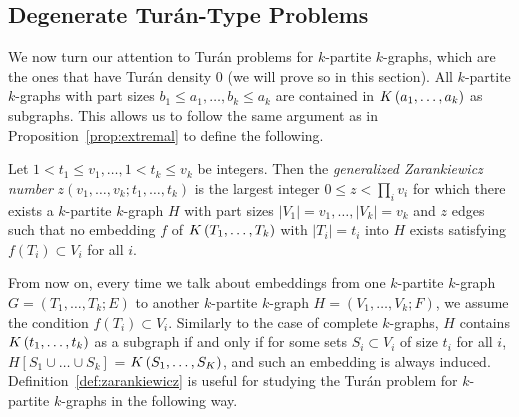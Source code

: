 \subsection{Degenerate Turán-Type Problems}\label{subsec:degenerate}

We now turn our attention to Turán problems for $k$-partite $k$-graphs,
which are the ones that have Turán density $0$ (we will prove so in this section).
All $k$-partite $k$-graphs with part sizes $b_1 \leq a_1, \dots, b_k \leq a_k$
are contained in $K\left(a_1, \dots, a_k\right)$ as subgraphs.
This allows us to follow the same argument as in Proposition~\ref{prop:extremal}
to define the following.

\begin{definition}\label{def:zarankiewicz}
    Let $1 < t_1 \leq v_1, \dots, 1 < t_k \leq v_k$ be integers.
    Then the \emph{generalized Zarankiewicz number} $z(v_1, \dots, v_k; t_1, \dots, t_k)$
    is the largest integer $0 \leq z < \prod_i{ v_i}$ for which there exists a $k$-partite $k$-graph
    $H$ with part sizes $ |V_1| = v_1, \dots, |V_k| = v_k$ and $z$ edges
    such that no embedding $f$ of $K\left(T_1, \dots, T_k\right)$ with $|T_i| = t_i$ into $H$ exists
    satisfying $f(T_i) \subset V_i$ for all $i$.
\end{definition}

From now on, every time we talk about embeddings from one $k$-partite $k$-graph
$G = (T_1, \dots, T_k; E)$ to another $k$-partite $k$-graph $H = (V_1, \dots, V_k; F)$,
we assume the condition $f(T_i) \subset V_i$.
Similarly to the case of complete $k$-graphs,
$H$ contains $K\left(t_1, \dots, t_k\right)$ as a subgraph if and only if
for some sets $S_i \subset V_i$ of size $t_i$ for all $i$,
$H[S_1 \cup \dots \cup S_k]$ = $K\left(S_1, \dots, S_K\right)$,
and such an embedding is always induced.
Definition~\ref{def:zarankiewicz} is useful for studying the Turán problem for $k$-partite $k$-graphs
in the following way.

